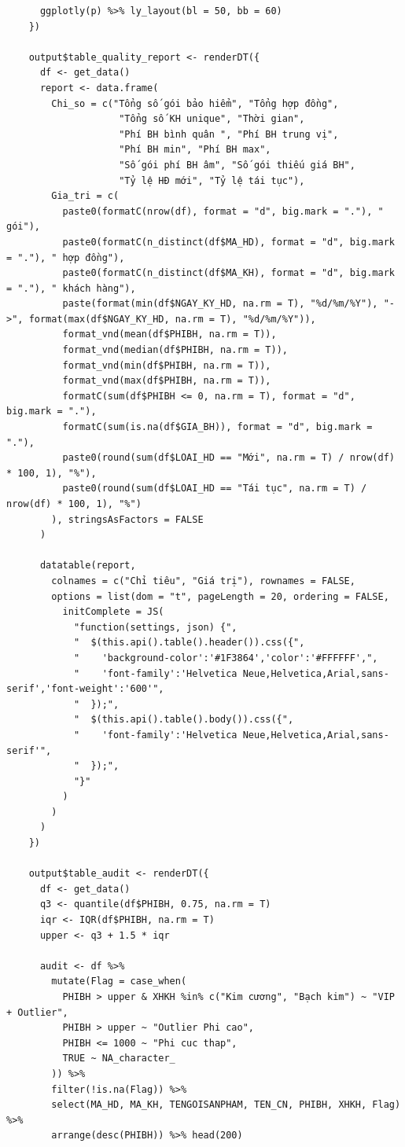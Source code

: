 \documentclass[12pt, a4paper]{article}
\begin{document}
\begin{lstlisting}
      ggplotly(p) %>% ly_layout(bl = 50, bb = 60)
    })

    output$table_quality_report <- renderDT({
      df <- get_data()
      report <- data.frame(
        Chi_so = c("Tổng số gói bảo hiểm", "Tổng hợp đồng",
                    "Tổng số KH unique", "Thời gian",
                    "Phí BH bình quân ", "Phí BH trung vị",
                    "Phí BH min", "Phí BH max",
                    "Số gói phí BH âm", "Số gói thiếu giá BH",
                    "Tỷ lệ HĐ mới", "Tỷ lệ tái tục"),
        Gia_tri = c(
          paste0(formatC(nrow(df), format = "d", big.mark = "."), " gói"),
          paste0(formatC(n_distinct(df$MA_HD), format = "d", big.mark = "."), " hợp đồng"),
          paste0(formatC(n_distinct(df$MA_KH), format = "d", big.mark = "."), " khách hàng"),
          paste(format(min(df$NGAY_KY_HD, na.rm = T), "%d/%m/%Y"), "->", format(max(df$NGAY_KY_HD, na.rm = T), "%d/%m/%Y")),
          format_vnd(mean(df$PHIBH, na.rm = T)),
          format_vnd(median(df$PHIBH, na.rm = T)),
          format_vnd(min(df$PHIBH, na.rm = T)),
          format_vnd(max(df$PHIBH, na.rm = T)),
          formatC(sum(df$PHIBH <= 0, na.rm = T), format = "d", big.mark = "."),
          formatC(sum(is.na(df$GIA_BH)), format = "d", big.mark = "."),
          paste0(round(sum(df$LOAI_HD == "Mới", na.rm = T) / nrow(df) * 100, 1), "%"),
          paste0(round(sum(df$LOAI_HD == "Tái tục", na.rm = T) / nrow(df) * 100, 1), "%")
        ), stringsAsFactors = FALSE
      )

      datatable(report,
        colnames = c("Chỉ tiêu", "Giá trị"), rownames = FALSE,
        options = list(dom = "t", pageLength = 20, ordering = FALSE,
          initComplete = JS(
            "function(settings, json) {",
            "  $(this.api().table().header()).css({",
            "    'background-color':'#1F3864','color':'#FFFFFF',",
            "    'font-family':'Helvetica Neue,Helvetica,Arial,sans-serif','font-weight':'600'",
            "  });",
            "  $(this.api().table().body()).css({",
            "    'font-family':'Helvetica Neue,Helvetica,Arial,sans-serif'",
            "  });",
            "}"
          )
        )
      )
    })

    output$table_audit <- renderDT({
      df <- get_data()
      q3 <- quantile(df$PHIBH, 0.75, na.rm = T)
      iqr <- IQR(df$PHIBH, na.rm = T)
      upper <- q3 + 1.5 * iqr

      audit <- df %>%
        mutate(Flag = case_when(
          PHIBH > upper & XHKH %in% c("Kim cương", "Bạch kim") ~ "VIP + Outlier",
          PHIBH > upper ~ "Outlier Phi cao",
          PHIBH <= 1000 ~ "Phi cuc thap",
          TRUE ~ NA_character_
        )) %>%
        filter(!is.na(Flag)) %>%
        select(MA_HD, MA_KH, TENGOISANPHAM, TEN_CN, PHIBH, XHKH, Flag) %>%
        arrange(desc(PHIBH)) %>% head(200)


\end{lstlisting}
\end{document}
